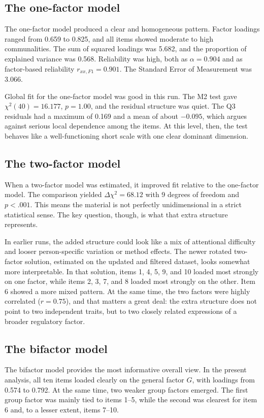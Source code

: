 \documentclass[11pt,a4paper]{article}
\begin{document}
\subsection{The one-factor model}
The one-factor model produced a clear and homogeneous pattern. Factor loadings ranged from 0.659 to 0.825, and all items showed moderate to high communalities. The sum of squared loadings was 5.682, and the proportion of explained variance was 0.568. Reliability was high, both as $\alpha = 0.904$ and as factor-based reliability $r_{xx,F1} = 0.901$. The Standard Error of Measurement was 3.066.

Global fit for the one-factor model was good in this run. The M2 test gave $\chi^2(40)=16.177$, $p=1.00$, and the residual structure was quiet. The Q3 residuals had a maximum of 0.169 and a mean of about $-0.095$, which argues against serious local dependence among the items. At this level, then, the test behaves like a well-functioning short scale with one clear dominant dimension.

\subsection{The two-factor model}
When a two-factor model was estimated, it improved fit relative to the one-factor model. The comparison yielded $\Delta \chi^2 = 68.12$ with 9 degrees of freedom and $p < .001$. This means the material is not perfectly unidimensional in a strict statistical sense. The key question, though, is what that extra structure represents.

In earlier runs, the added structure could look like a mix of attentional difficulty and looser person-specific variation or method effects. The newer rotated two-factor solution, estimated on the updated and filtered dataset, looks somewhat more interpretable. In that solution, items 1, 4, 5, 9, and 10 loaded most strongly on one factor, while items 2, 3, 7, and 8 loaded most strongly on the other. Item 6 showed a more mixed pattern. At the same time, the two factors were highly correlated ($r = 0.75$), and that matters a great deal: the extra structure does not point to two independent traits, but to two closely related expressions of a broader regulatory factor.

\subsection{The bifactor model}
The bifactor model provides the most informative overall view. In the present analysis, all ten items loaded clearly on the general factor $G$, with loadings from 0.574 to 0.792. At the same time, two weaker group factors emerged. The first group factor was mainly tied to items 1--5, while the second was clearest for item 6 and, to a lesser extent, items 7--10.
\end{document}
